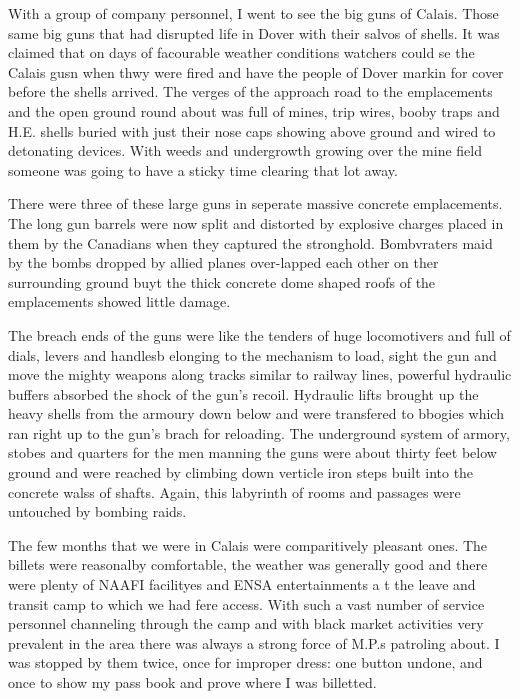 With a group of company personnel, I went to see the big guns of
Calais. Those same big guns that had disrupted life in Dover with
their salvos of shells. It was claimed that on days of facourable
weather conditions watchers could se the Calais gusn when thwy were
fired and have the people of Dover markin for cover before the shells
arrived. The verges of the approach road to the emplacements and the
open ground round about was full of mines, trip wires, booby traps and
H.E. shells buried with just their nose caps showing above ground and
wired to detonating devices. With weeds and undergrowth growing over
the mine field someone was going to have a sticky time clearing that
lot away.

There were three of these large guns in seperate massive concrete
emplacements. The long gun barrels were now split and distorted by
explosive charges placed in them by the Canadians when they captured
the stronghold. Bombvraters maid by the bombs dropped by allied planes
over-lapped each other on ther surrounding ground buyt the thick
concrete dome shaped roofs of the emplacements showed little damage.

The breach ends of the guns were like the tenders of huge locomotivers
and full of dials, levers and handlesb elonging to the mechanism to
load, sight the gun and move the mighty weapons along tracks similar
to railway lines, powerful hydraulic buffers absorbed the shock of the
gun's recoil. Hydraulic lifts brought up the heavy shells from the
armoury down below and were transfered to bbogies which ran right up
to the gun's brach for reloading. The underground system of armory,
stobes and quarters for the men manning the guns were about thirty
feet below ground and were reached by climbing down verticle iron
steps built into the concrete walss of shafts. Again, this labyrinth
of rooms and passages were untouched by bombing raids.

The few months that we were in Calais were comparitively pleasant
ones. The billets were reasonalby comfortable, the weather was
generally good and there were plenty of NAAFI facilityes and ENSA
entertainments a t the leave and transit camp to which we had fere
access. With such a vast number of service personnel channeling
through the camp and with black market activities very prevalent in
the area there was always a strong force of M.P.s patroling about. I
was stopped by them twice, once for improper dress: one button undone,
and once to show my pass book and prove where I was billetted.

